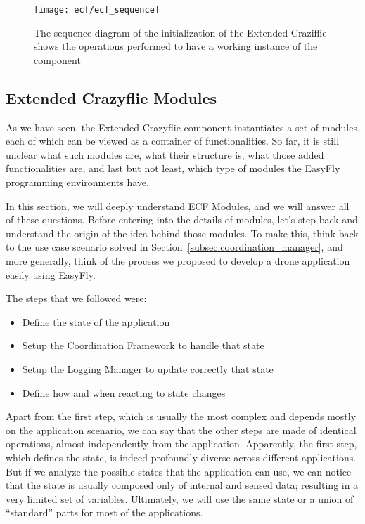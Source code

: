 \begin{figure}[tb]
    \centering
    \texttt{[image: ecf/ecf\_sequence]} 
    \caption[ECF initialization sequence diagram]{The sequence diagram of the initialization of the Extended Craziflie shows the operations performed to have a working instance of the component}\label{fig:ecf_sequence}
\end{figure}


\subsection{Extended Crazyflie Modules}\label{subsec:ecf_modules_overview}
As we have seen, the Extended Crazyflie component instantiates a set of modules, each of which can be viewed as a container of functionalities.
So far, it is still unclear what such modules are, what their structure is, what those added functionalities are, and last but not least, which type of modules the EasyFly programming environments have. 

In this section, we will deeply understand ECF Modules, and we will answer all of these questions.
Before entering into the details of modules, let's step back and understand the origin of the idea behind those modules.
To make this, think back to the use case scenario solved in Section~\ref{subsec:coordination_manager}, and more generally, think of the process we proposed to develop a drone application easily using EasyFly.

The steps that we followed were:
\begin{itemize}
    \item Define the state of the application
    \item Setup the Coordination Framework to handle that state
    \item Setup the Logging Manager to update correctly that state
    \item Define how and when reacting to state changes
\end{itemize}

Apart from the first step, which is usually the most complex and depends mostly on the application scenario, we can say that the other steps are made of identical operations, almost independently from the application.
Apparently, the first step, which defines the state, is indeed profoundly diverse across different applications.
But if we analyze the possible states that the application can use, we can notice that the state is usually composed only of internal and sensed data; 
resulting in a very limited set of variables.
Ultimately, we will use the same state or a union of “standard” parts for most of the applications. 

